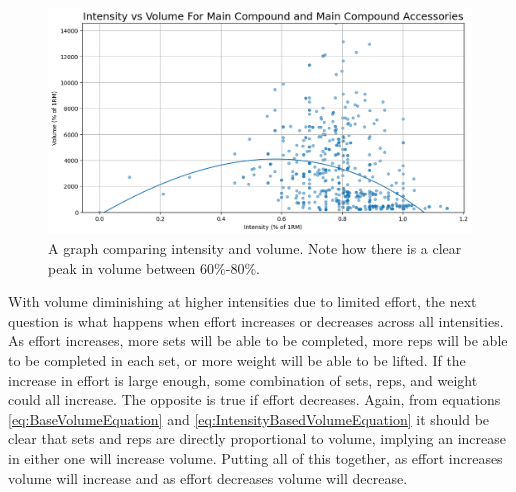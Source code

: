 \begin{figure}
    \centering
    \includegraphics[scale=0.55]{images/ch3/IntensityVsVolume.png}
    \caption{A graph comparing intensity and volume. Note how there is a clear peak in volume between $60\%$-$80\%$.} 
    \label{fig:IntensityVsVolumeGraph}
\end{figure}

With volume diminishing at higher intensities due to limited effort, the next question is what happens when effort increases or decreases across all intensities. As effort increases, more sets will be able to be completed, more reps will be able to be completed in each set, or more weight will be able to be lifted. If the increase in effort is large enough, some combination of sets, reps, and weight could all increase. The opposite is true if effort decreases. Again, from equations \ref{eq:BaseVolumeEquation} and \ref{eq:IntensityBasedVolumeEquation} it should be clear that sets and reps are directly proportional to volume, implying an increase in either one will increase volume. Putting all of this together, as effort increases volume will increase and as effort decreases volume will decrease.

